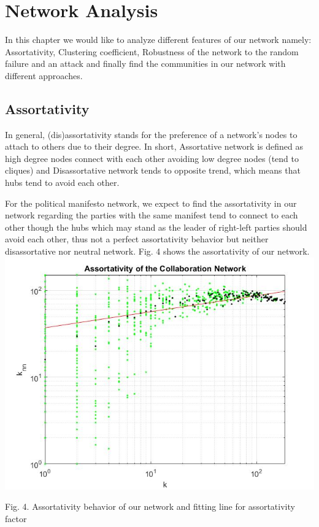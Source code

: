 \documentclass{article}%
\begin{document}
\section*{Network Analysis}

In this chapter we would like to analyze different features of our network namely: Assortativity, Clustering coefficient, Robustness of the network to the random failure and an attack and finally find the communities in our network with different approaches.

\subsection*{Assortativity}

In general, (dis)assortativity stands for the preference of a network's nodes to attach to others due to their degree. In short, Assortative network is defined as high degree nodes connect with each other avoiding low degree nodes (tend to cliques) and Disassortative network tends to opposite trend, which means that hubs tend to avoid each other. 

For the political manifesto network, we expect to find the assortativity in our network regarding the parties with the same manifest tend to connect to each other though the hubs which may stand as the leader of right-left parties should avoid each other, thus not a perfect assortativity behavior but neither disassortative nor neutral network. Fig. 4 shows the assortativity of our network.
\\

\includegraphics[scale=0.5]{Assortativity}
\begin{center}
\begin{small}
Fig. 4. Assortativity behavior of our network and fitting line for assortativity factor
\end{small}
\end{center}
\end{document}
